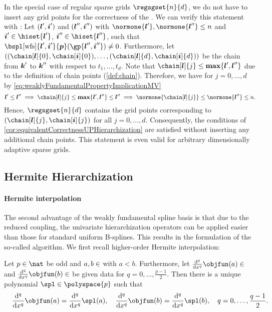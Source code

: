 In the special case of regular sparse grids $\regsgset{n}{d}$,
we do not have to insert any grid points for the correctness of the \up.
We can verify this statement with
:
Let $({\boldsymbol{l}}',{\boldsymbol{i}}')$ and $({\boldsymbol{l}}'',{\boldsymbol{i}}'')$ with
$\normone{\*l'}, \normone{\*l''} \le n$ and
$\*i' \in \hiset{\*l'}$, $\*i'' \in \hiset{\*l''}$,
such that $\bspl[\wfs]{\*l',\*i'}{\*p}(\gp{\*l'',\*i''}) \not= 0$.
Furthermore, let $((\chain[\*l]{0}, \chain[\*i]{0}), \dotsc,
(\chain[\*l]{d}, \chain[\*i]{d}))$ be the chain
from ${\boldsymbol{k}}'$ to ${\boldsymbol{k}}''$ with respect to $t_1, \dotsc, t_d$.
Note that $\chain[\*l]{j} \le \vecmax\{\*l', \*l''\}$ due to the
definition of chain points (\cref{def:chain}).
Therefore, we have for $j = 0, \dotsc, d$
by \eqref{eq:weaklyFundamentalPropertyImplicationMV}
\begin{equation}
  \*l' \le \*l''
  \implies
  \chain[\*l]{j} \le \vecmax\{\*l', \*l''\} \le \*l''
  \implies
  \normone{\chain[\*l]{j}} \le \normone{\*l''} \le n.
\end{equation}
Hence, $\regsgset{n}{d}$ contains the grid points corresponding to
$(\chain[\*l]{j}, \chain[\*i]{j})$ for all $j = 0, \dotsc, d$.
Consequently, the conditions of
\cref{cor:equivalentCorrectnessUPHierarchization} are satisfied without
inserting any additional chain points.
This statement is even valid for arbitrary
dimensionally adaptive sparse grids.



\subsection{Hermite Hierarchization}
\label{sec:455hermiteHierarchization}

\paragraph{Hermite interpolation}

The second advantage of the weakly fundamental spline basis
is that due to the reduced coupling,
the univariate hierarchization operators can be applied easier
than those for standard uniform B-splines.
This results in the formulation of the so-called
 algorithm.
We first recall higher-order Hermite interpolation:

\begin{lemma}
  \label{lemma:hermiteInterpolation}
  Let $p \in \nat$ be odd and $a, b \in \real$ with $a < b$.
  Furthermore, let
  $\frac{\diff^q}{\dx^q} \objfun(a) \in \real$ and
  $\frac{\diff^q}{\dx^q} \objfun(b) \in \real$ be given data
  for $q = 0, \dotsc, \frac{p-1}{2}$.
  Then there is a unique polynomial $\spl \in \polyspace{p}$ such that
  \begin{equation}
    \frac{\diff^q}{\dx^q} \objfun(a)
    = \frac{\diff^q}{\dx^q} \spl(a),\quad
    \frac{\diff^q}{\dx^q} \objfun(b)
    = \frac{\diff^q}{\dx^q} \spl(b),\quad
    q = 0, \dotsc, \frac{q-1}{2}.
    \hspace*{-10mm}
  \end{equation}
\end{lemma}

